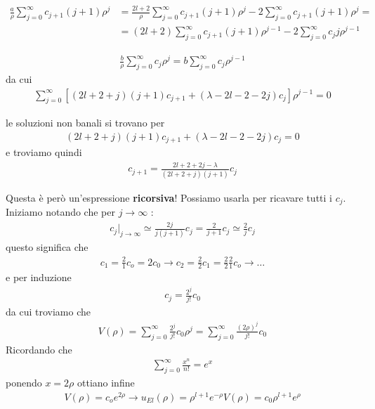  \begin{align}
\frac{a}{\rho}\sum_{j=0}^\infty c_{j+1} (j+1)\rho^j {}&= 
\frac{2l + 2}{\rho}\sum_{j=0}^\infty c_{j+1} (j+1)\rho^j - 2 \sum_{j=0}^\infty c_{j+1} (j+1)\rho^j = \nonumber \\
&= (2l + 2)\sum_{j=0}^\infty c_{j+1} (j+1)\rho^{j-1} - 2 \sum_{j=0}^\infty c_{j} j\rho^{j-1}
 \end{align}
 
 \begin{align}
	 \frac{b}{\rho}\sum_{j=0}^\infty c_j \rho^j= b\sum_{j=0}^\infty c_j \rho^{j-1}
 \end{align}
 da cui
 \begin{align}
	  \sum_{j=0}^\infty [ (2l+2+j)(j+1)c_{j+1}  + (\lambda - 2l - 2 - 2j)c_j ] \rho^{j-1}=0
 \end{align}

 le soluzioni non banali si trovano per
  \begin{align}
  (2l+2+j)(j+1)c_{j+1}  + (\lambda - 2l - 2 - 2j)c_j =0
 \end{align}
  e troviamo quindi
  \begin{align}
 c_{j+1}  = \frac{2l + 2 + 2j - \lambda}{(2l+2+j)(j+1)}c_j 
 \end{align}
 
 Questa è però un'espressione \textbf{ricorsiva}! Possiamo usarla per ricavare tutti i $c_j$. Iniziamo notando che per $j \rightarrow \infty$ :
 \begin{align}
 c_j |_{j \rightarrow \infty} \simeq \frac{2j}{j(j+1)}c_j = \frac{2}{j+1}c_j \simeq \frac{2}{j}c_j
 \end{align}
 questo significa che
 \begin{align}
c_1= \frac{2}{1}c_o = 2c_0 \rightarrow c_2= \frac{2}{2}c_1= \frac{2}{2}\frac{2}{1}c_o \rightarrow \dots
\end{align}
e per induzione
\begin{align}
c_j = \frac{2^j}{j!}c_0
\end{align}
da cui troviamo che
\begin{align}
V(\rho)= \sum_{j=0}^\infty \frac{2^j}{j!}c_0 \rho^j = \sum_{j=0}^\infty \frac{(2\rho)^j}{j!}c_0
\end{align}
Ricordando che
\begin{align}
\sum_{j=0}^\infty \frac{x^n}{n!} = e^x
\end{align}
ponendo $x= 2\rho$ ottiano infine
\begin{align}
V(\rho)= c_o e^{2\rho} \rightarrow  u_{E l}(\rho)= \rho^{l+1}e^{-\rho}V(\rho)= c_0 \rho^{l+1} e^\rho
\end{align}

